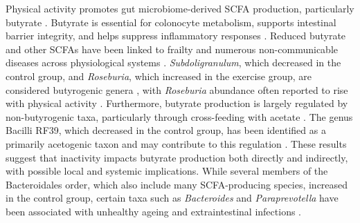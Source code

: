 \documentclass[preprint,12pt,authoryear]{elsarticle}
\begin{document}
    Physical activity promotes gut microbiome-derived SCFA production, particularly butyrate \citep{mondaExerciseModifiesGut2017, matsumotoVoluntaryRunningExercise2008}. Butyrate is essential for colonocyte metabolism, supports intestinal barrier integrity, and helps suppress inflammatory responses \citep{litvakColonocyteMetabolismShapes2018, wongColonicHealthFermentation2006, kellyCrosstalkMicrobiotaDerivedShortChain2015}. Reduced butyrate and other SCFAs have been linked to frailty and numerous non-communicable diseases across physiological systems  \citep{gomaaHumanGutMicrobiota2020, jacksonSignaturesEarlyFrailty2016, ferrucciInflammageingChronicInflammation2018, otooleMicrobiomeHealthInteractions2018, rampelliFunctionalMetagenomicProfiling2013}. \textit{Subdoligranulum}, which decreased in the control group, and \textit{Roseburia}, which increased in the exercise group, are considered butyrogenic genera \citep{holmstromSubdoligranulumVariabileGen2004, vanhulCorrelationCausalityCase2020, allenExerciseAltersGut2018}, with \textit{Roseburia} abundance often reported to rise with physical activity \citep{allenExerciseAltersGut2018, estakiCardiorespiratoryFitnessPredictor2016, quirogaExerciseTrainingModulates2020}. Furthermore, butyrate production is largely regulated by non-butyrogenic taxa, particularly through cross-feeding with acetate \citep{daisleyEmergingConnectionsGut2021, esquivel-elizondoInsightsButyrateProduction2017, barcenillaPhylogeneticRelationshipsButyrateProducing2000}. The genus Bacilli RF39, which decreased in the control group, has been identified as a primarily acetogenic taxon and may contribute to this regulation \citep{wangPhylogenomicsExpandingUncultured2020}. These results suggest that inactivity impacts butyrate production both directly and indirectly, with possible local and systemic implications. While several members of the Bacteroidales order, which also include many SCFA-producing species, increased in the control group, certain taxa such as \textit{Bacteroides} and \textit{Paraprevotella} have been associated with unhealthy ageing and extraintestinal infections \citep{wilmanskiGutMicrobiomePattern2021, wexlerBacteroidesGoodBad2007, kellyGutMicrobiomeAssociates2016, liAlterationsGutMicrobiota2019}. 
\end{document}
